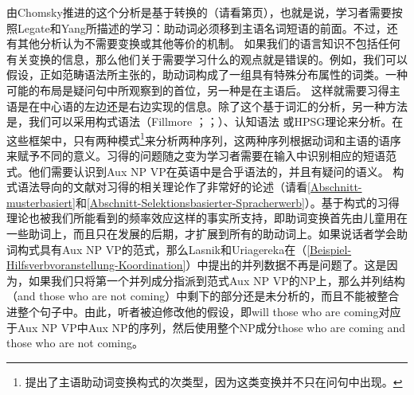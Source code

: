 \noindent
由Chomsky推进的这个分析是基于转换的（请看第\pageref{Seite-GB-Entscheidungsfragen-Englisch}页），也就是说，学习者需要按照Legate和Yang所描述的学习：助动词必须移到主语名词短语的前面。不过，还有其他分析认为不需要变换或其他等价的机制。
如果我们的语言知识不包括任何有关变换的信息，那么他们关于需要学习什么的观点就是错误的。例如，我们可以假设，正如范畴语法所主张的，助动词构成了一组具有特殊分布属性的词类。一种可能的布局是疑问句中所观察到的首位，另一种是在主语后\citep[]{Villavicencio2002a}。
这样就需要习得主语是在中心语的左边还是右边实现的信息。除了这个基于词汇的分析，另一种方法是，我们可以采用构式语法（Fillmore \citeyear[]{Fillmore88a}；\citeyear{Fillmore99a}；\citealp[]{KF99a}）、认知语法 \citep[\S~9]{Dabrowska2004a}或HPSG理论\indexhpsg \citep{GSag2000a-u}来分析。在这些框架中，只有两种模式\footnote{%
	 \citet{Fillmore99a}提出了主语助动词变换构式的次类型，因为这类变换并不只在问句中出现。
}来分析两种序列，这两种序列根据动词和主语的语序来赋予不同的意义。习得的问题随之变为学习者需要在输入中识别相应的短语范式。他们需要认识到Aux NP VP在英语中是合乎语法的，并且有疑问的语义。
构式语法导向的文献对习得的相关理论作了非常好的论述（请看\ref{Abschnitt-musterbasiert}和\ref{Abschnitt-Selektionsbasierter-Spracherwerb}）。基于构式的习得理论也被我们所能看到的频率效应这样的事实所支持，即助词变换首先由儿童用在一些助词上，而且只在发展的后期，才扩展到所有的助动词上。如果说话者学会助词构式具有Aux NP
VP的范式，那么Lasnik和Uriagereka在（\ref{Beispiel-Hilfsverbvoranstellung-Koordination}）中提出的并列数据不再是问题了。这是因为，如果我们只将第一个并列成分指派到范式Aux NP VP的NP上，那么并列结构（and those who are not coming）中剩下的部分还是未分析的，而且不能被整合进整个句子中。由此，听者被迫修改他的假设，即will those who are coming对应于Aux NP VP中Aux NP的序列，然后使用整个NP成分those who are coming and those who are not coming。
